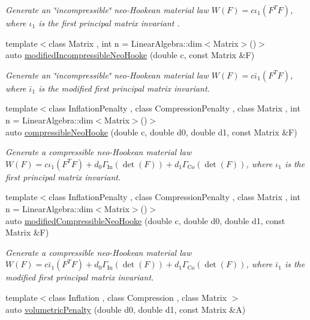 \begin{DoxyCompactItemize}
\begin{DoxyCompactList}\small\item\em Generate an \char`\"{}incompressible\char`\"{} neo-\/\+Hookean material law $ W(F)=c\iota_1(F^T F) $, where $\iota_1$ is the first principal matrix invariant . \end{DoxyCompactList}\item 
{\footnotesize template$<$class Matrix , int n = Linear\+Algebra\+::dim$<$\+Matrix$>$()$>$ }\\auto \hyperlink{group__Rubber_gaf6f5ab6a379ef03d513acc5042731a01}{modified\+Incompressible\+Neo\+Hooke} (double c, const Matrix \&F)
\begin{DoxyCompactList}\small\item\em Generate an \char`\"{}incompressible\char`\"{} neo-\/\+Hookean material law $ W(F)=c\bar\iota_1(F^T F) $, where $\bar\iota_1$ is the modified first principal matrix invariant. \end{DoxyCompactList}\item 
{\footnotesize template$<$class Inflation\+Penalty , class Compression\+Penalty , class Matrix , int n = Linear\+Algebra\+::dim$<$\+Matrix$>$()$>$ }\\auto \hyperlink{group__Rubber_gac5c39cd9de55f4f0220a806cf28a7b30}{compressible\+Neo\+Hooke} (double c, double d0, double d1, const Matrix \&F)
\begin{DoxyCompactList}\small\item\em Generate a compressible neo-\/\+Hookean material law $ W(F)=c\iota_1(F^T F)+d_0\Gamma_\mathrm{In}(\det(F))+d_1\Gamma_\mathrm{Co}(\det(F)) $, where $\iota_1$ is the first principal matrix invariant. \end{DoxyCompactList}\item 
{\footnotesize template$<$class Inflation\+Penalty , class Compression\+Penalty , class Matrix , int n = Linear\+Algebra\+::dim$<$\+Matrix$>$()$>$ }\\auto \hyperlink{group__Rubber_gac10942df03f037afdf0a81d330361a6b}{modified\+Compressible\+Neo\+Hooke} (double c, double d0, double d1, const Matrix \&F)
\begin{DoxyCompactList}\small\item\em Generate a compressible neo-\/\+Hookean material law $ W(F)=c\bar\iota_1(F^T F)+d_0\Gamma_\mathrm{In}(\det(F))+d_1\Gamma_\mathrm{Co}(\det(F)) $, where $\bar\iota_1$ is the modified first principal matrix invariant. \end{DoxyCompactList}\item 
{\footnotesize template$<$class Inflation , class Compression , class Matrix $>$ }\\auto \hyperlink{namespaceFunG_ad26faeb264bb4b1cd7e70f3811c366c8}{volumetric\+Penalty} (double d0, double d1, const Matrix \&A)

\end{DoxyCompactItemize}
